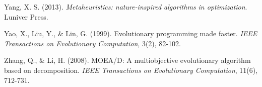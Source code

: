 \documentclass[12pt,a4paper]{article}
\begin{document}
\begin{thebibliography}{99}
Yang, X. S. (2013). \textit{Metaheuristics: nature-inspired algorithms in optimization}. Luniver Press.

Yao, X., Liu, Y., \& Lin, G. (1999). Evolutionary programming made faster. \textit{IEEE Transactions on Evolutionary Computation}, 3(2), 82-102.

Zhang, Q., \& Li, H. (2008). MOEA/D: A multiobjective evolutionary algorithm based on decomposition. \textit{IEEE Transactions on Evolutionary Computation}, 11(6), 712-731.

\end{thebibliography}
\end{document}
